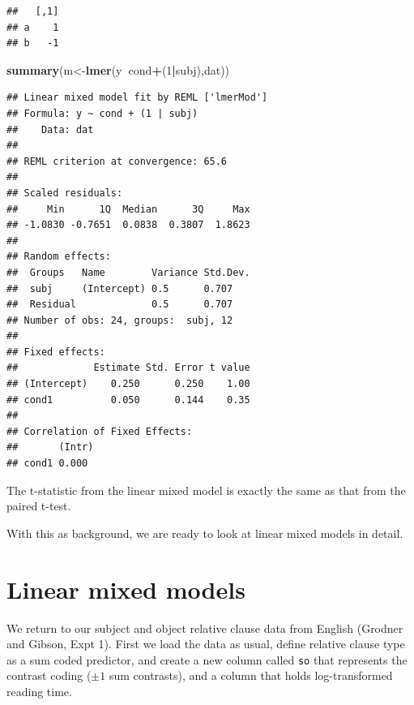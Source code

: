 \documentclass[12pt,]{krantz}
\newenvironment{Shaded}{\begin{snugshade}}{\end{snugshade}}
\newcommand{\DataTypeTok}[1]{\textcolor[rgb]{0.13,0.29,0.53}{#1}}
\newcommand{\DecValTok}[1]{\textcolor[rgb]{0.00,0.00,0.81}{#1}}
\newcommand{\KeywordTok}[1]{\textcolor[rgb]{0.13,0.29,0.53}{\textbf{#1}}}
\newcommand{\NormalTok}[1]{#1}
\newcommand{\OperatorTok}[1]{\textcolor[rgb]{0.81,0.36,0.00}{\textbf{#1}}}
\newcommand{\OtherTok}[1]{\textcolor[rgb]{0.56,0.35,0.01}{#1}}
\newcommand{\StringTok}[1]{\textcolor[rgb]{0.31,0.60,0.02}{#1}}
\begin{document}
\begin{verbatim}
##   [,1]
## a    1
## b   -1
\end{verbatim}

\begin{Shaded}
\begin{Highlighting}[]
\KeywordTok{summary}\NormalTok{(m<-}\KeywordTok{lmer}\NormalTok{(y}\OperatorTok{~}\NormalTok{cond}\OperatorTok{+}\NormalTok{(}\DecValTok{1}\OperatorTok{|}\NormalTok{subj),dat))}
\end{Highlighting}
\end{Shaded}

\begin{verbatim}
## Linear mixed model fit by REML ['lmerMod']
## Formula: y ~ cond + (1 | subj)
##    Data: dat
## 
## REML criterion at convergence: 65.6
## 
## Scaled residuals: 
##     Min      1Q  Median      3Q     Max 
## -1.0830 -0.7651  0.0838  0.3807  1.8623 
## 
## Random effects:
##  Groups   Name        Variance Std.Dev.
##  subj     (Intercept) 0.5      0.707   
##  Residual             0.5      0.707   
## Number of obs: 24, groups:  subj, 12
## 
## Fixed effects:
##             Estimate Std. Error t value
## (Intercept)    0.250      0.250    1.00
## cond1          0.050      0.144    0.35
## 
## Correlation of Fixed Effects:
##       (Intr)
## cond1 0.000
\end{verbatim}

The t-statistic from the linear mixed model is exactly the same as that from the paired t-test.

With this as background, we are ready to look at linear mixed models in detail.

\hypertarget{linear-mixed-models}{%
\section{Linear mixed models}\label{linear-mixed-models}}

We return to our subject and object relative clause data from English (Grodner and Gibson, Expt 1). First we load the data as usual, define relative clause type as a sum coded predictor, and create a new column called \texttt{so} that represents the contrast coding (\(\pm 1\) sum contrasts), and a column that holds log-transformed reading time.

\begin{Shaded}
\end{Shaded}
\end{document}
